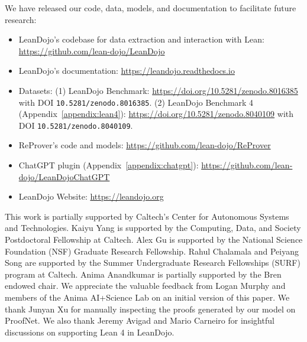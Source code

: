 \documentclass{article}
\newcommand{\weburl}{\url{https://leandojo.org}}
\begin{document}
We have released our code, data, models, and documentation to facilitate future research:

\begin{itemize}
    \item LeanDojo's codebase for data extraction and interaction with Lean: \url{https://github.com/lean-dojo/LeanDojo}
    \item LeanDojo's documentation: \url{https://leandojo.readthedocs.io}
    \item Datasets: (1) LeanDojo Benchmark: \url{https://doi.org/10.5281/zenodo.8016385} with DOI \texttt{10.5281/zenodo.8016385}. (2) LeanDojo Benchmark 4 (Appendix~\ref{appendix:lean4}): \url{https://doi.org/10.5281/zenodo.8040109} with DOI \texttt{10.5281/zenodo.8040109}.
    \item ReProver's code and models: \url{https://github.com/lean-dojo/ReProver}
    \item ChatGPT plugin (Appendix~\ref{appendix:chatgpt}): \url{https://github.com/lean-dojo/LeanDojoChatGPT}
    \item LeanDojo Website: \weburl
\end{itemize}



\begin{ack}
\label{sec:ack}
This work is partially supported by Caltech's Center for Autonomous Systems and Technologies. Kaiyu Yang is supported by the Computing, Data, and Society Postdoctoral Fellowship at Caltech. Alex Gu is supported by the National Science Foundation (NSF) Graduate Research Fellowship. Rahul Chalamala and Peiyang Song are supported by the Summer Undergraduate Research Fellowships (SURF) program at Caltech. Anima Anandkumar is partially supported by the Bren endowed chair. We appreciate the valuable feedback from Logan Murphy and members of the Anima AI+Science Lab on an initial version of this paper. We thank Junyan Xu for manually inspecting the proofs generated by our model on ProofNet. We also thank Jeremy Avigad and Mario Carneiro for insightful discussions on supporting Lean 4 in LeanDojo.
\end{ack}

\resettocdepth

\clearpage
{\small


}

\appendix
\clearpage
\renewcommand{\contentsname}{Appendix}
\tableofcontents
\clearpage
\end{document}
